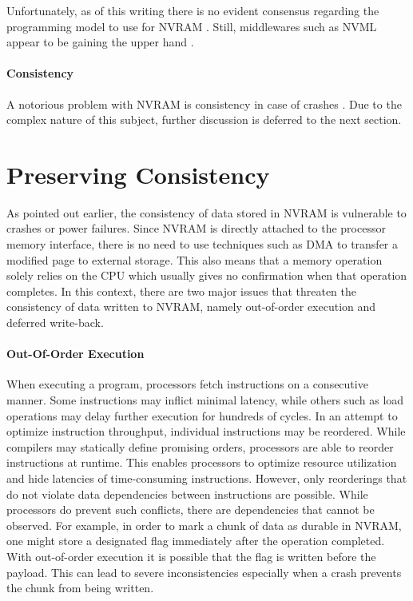 Unfortunately, as of this writing there is no evident consensus regarding the
programming model to use for NVRAM \cite{boehm2016persistence}. Still,
middlewares such as NVML appear to be gaining the upper hand
\cite{oukid2017data, volos2017whisper, malinowski2017using, andrei2017sap}.

\paragraph{Consistency}

A notorious problem with NVRAM is consistency in case of crashes
\cite{condit2009better, dulloor2014system, oukid2017data}. Due to the complex
nature of this subject, further discussion is deferred to the next section.

\section{Preserving Consistency}

As pointed out earlier, the consistency of data stored in NVRAM is vulnerable to
crashes or power failures. Since NVRAM is directly attached to the processor
memory interface, there is no need to use techniques such as DMA to transfer a
modified page to external storage. This also means that a memory operation
solely relies on the CPU which usually gives no confirmation when that operation
completes. In this context, there are two major issues that threaten the
consistency of data written to NVRAM, namely out-of-order execution and deferred
write-back.

\paragraph{Out-Of-Order Execution}

When executing a program, processors fetch instructions on a consecutive manner.
Some instructions may inflict minimal latency, while others such as load
operations may delay further execution for hundreds of cycles. In an attempt to
optimize instruction throughput, individual instructions may be reordered. While
compilers may statically define promising orders, processors are able to reorder
instructions at runtime. This enables processors to optimize resource
utilization and hide latencies of time-consuming instructions. However, only
reorderings that do not violate data dependencies between instructions are
possible. While processors do prevent such conflicts, there are dependencies
that cannot be observed. For example, in order to mark a chunk of data as
durable in NVRAM, one might store a designated flag immediately after the
operation completed. With out-of-order execution it is possible that the flag is
written before the payload. This can lead to severe inconsistencies especially
when a crash prevents the chunk from being written.


